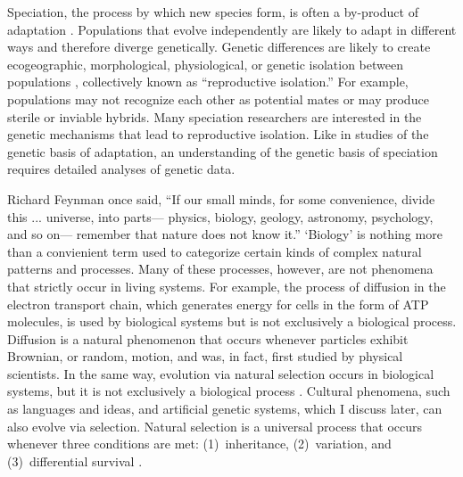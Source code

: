 \begin{doublespace}
Speciation, the process by which new species form,
is often a by-product of adaptation \citep{coy04,sch09,sob10}.
%
Populations that evolve independently are likely to adapt in different ways
and therefore diverge genetically.
%
Genetic differences are likely to create ecogeographic, morphological,
physiological, or genetic isolation between populations \citep{coy04,sch10},
collectively known as ``reproductive isolation.''
%
For example, populations may not recognize each other as potential mates
or may produce sterile or inviable hybrids.
%
Many speciation researchers are interested
in the genetic mechanisms that lead to reproductive isolation.
%
Like in studies of the genetic basis of adaptation,
an understanding of the genetic basis of speciation
requires detailed analyses of genetic data.


%

%

Richard Feynman once said, ``If our small minds, for some convenience,
divide this ... universe, into parts---%
physics, biology, geology, astronomy, psychology, and so on---%
remember that nature does not know it.''
%
`Biology' is nothing more than a convienient term used to categorize
certain kinds of complex natural patterns and processes.
%
Many of these processes, however, are not phenomena
that strictly occur in living systems.
%
For example, the process of diffusion in the electron transport chain,
which generates energy for cells in the form of ATP molecules,
is used by biological systems but is not exclusively a biological process.
%
Diffusion is a natural phenomenon that occurs whenever
particles exhibit Brownian, or random, motion,
and was, in fact, first studied by physical scientists.
%
In the same way, evolution via natural selection occurs in biological systems,
but it is not exclusively a biological process \citep{pen07}.
%
Cultural phenomena, such as languages and ideas,
and artificial genetic systems, which I discuss later,
can also evolve via selection.
%
Natural selection is a universal process that occurs whenever
three conditions are met:
(1)~inheritance, (2)~variation, and (3)~differential survival \citep{ada06}.




\end{doublespace}
